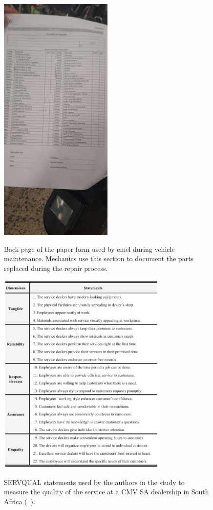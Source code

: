 \begin{figure}[htbp]
  \caption{Back page of the paper form used by \ac{emel} during vehicle maintenance. Mechanics use this section to document the parts replaced during the repair process.}
  \centering
  \includegraphics[width=0.50\textwidth]{figs/chapter2/emel_back}
  \label{fig:emel_back}
\end{figure}


\begin{figure}[htbp]
  \caption{SERVQUAL statements used by the authors in the study to measure the quality of the service at a CMV SA dealership in South Africa (~\cite{Measuring_After_sales_Service_Quality}).}
  \centering
  \includegraphics[width=0.75\textwidth]{figs/SERVQUAL_statements}
  \label{fig:SERVQUAL_statements}
\end{figure}


